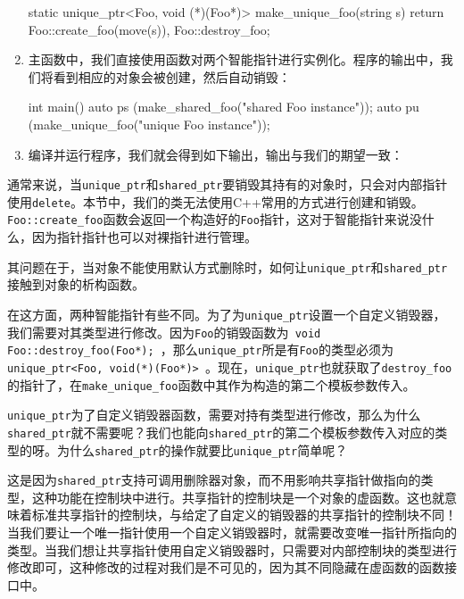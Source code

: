 \begin{enumerate}
\begin{codebox}[cpp]
static unique_ptr<Foo, void (*)(Foo*)> make_unique_foo(string s)
{
    return {Foo::create_foo(move(s)), Foo::destroy_foo};
}
\end{codebox}

\item 主函数中，我们直接使用函数对两个智能指针进行实例化。程序的输出中，我们将看到相应的对象会被创建，然后自动销毁：

\begin{codebox}[cpp]
int main()
{
    auto ps (make_shared_foo("shared Foo instance"));
    auto pu (make_unique_foo("unique Foo instance"));
}
\end{codebox}

\item 编译并运行程序，我们就会得到如下输出，输出与我们的期望一致：


\end{enumerate}


通常来说，当\texttt{unique\_ptr}和\texttt{shared\_ptr}要销毁其持有的对象时，只会对内部指针使用\texttt{delete}。本节中，我们的类无法使用C++常用的方式进行创建和销毁。\texttt{Foo::create\_foo}函数会返回一个构造好的\texttt{Foo}指针，这对于智能指针来说没什么，因为指针指针也可以对裸指针进行管理。

其问题在于，当对象不能使用默认方式删除时，如何让\texttt{unique\_ptr}和\texttt{shared\_ptr}接触到对象的析构函数。

在这方面，两种智能指针有些不同。为了为\texttt{unique\_ptr}设置一个自定义销毁器，我们需要对其类型进行修改。因为\texttt{Foo}的销毁函数为\texttt{ void Foo::destroy\_foo(Foo*); }，那么\texttt{unique\_ptr}所是有\texttt{Foo}的类型必须为\texttt{ unique\_ptr<Foo, void(*)(Foo*)> }。现在，\texttt{unique\_ptr}也就获取了\texttt{destroy\_foo}的指针了，在\texttt{make\_unique\_foo}函数中其作为构造的第二个模板参数传入。

\texttt{unique\_ptr}为了自定义销毁器函数，需要对持有类型进行修改，那么为什么\texttt{shared\_ptr}就不需要呢？我们也能向\texttt{shared\_ptr}的第二个模板参数传入对应的类型的呀。为什么\texttt{shared\_ptr}的操作就要比\texttt{unique\_ptr}简单呢？

这是因为\texttt{shared\_ptr}支持可调用删除器对象，而不用影响共享指针做指向的类型，这种功能在控制块中进行。共享指针的控制块是一个对象的虚函数。这也就意味着标准共享指针的控制块，与给定了自定义的销毁器的共享指针的控制块不同！当我们要让一个唯一指针使用一个自定义销毁器时，就需要改变唯一指针所指向的类型。当我们想让共享指针使用自定义销毁器时，只需要对内部控制块的类型进行修改即可，这种修改的过程对我们是不可见的，因为其不同隐藏在虚函数的函数接口中。

